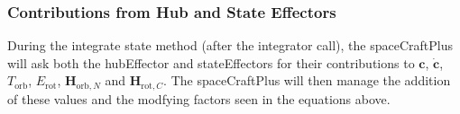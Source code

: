 \subsubsection{Contributions from Hub and State Effectors}
During the integrate state method (after the integrator call), the spaceCraftPlus will ask both the hubEffector and stateEffectors for their contributions to $\bm c$, $\dot{\bm c}$, $T_{\text{orb}}$, $E_{\text{rot}}$, $\bm H_{\text{orb},N}$ and $\bm H_{\text{rot},C}$. The spaceCraftPlus will then manage the addition of these values and the modfying factors seen in the equations above. 
